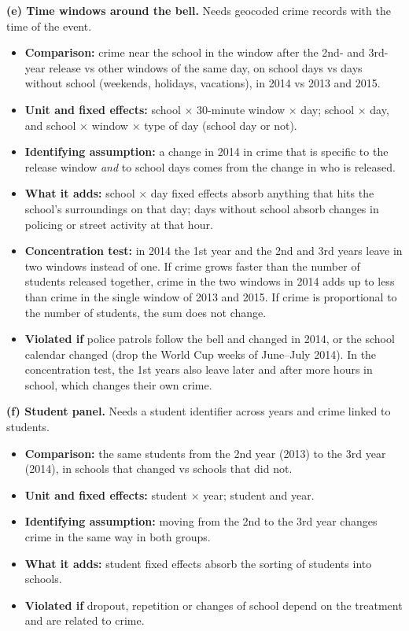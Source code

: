 \documentclass[11pt]{article}
\begin{document}
\medskip
\noindent\textbf{(e) Time windows around the bell.} Needs geocoded crime
records with the time of the event.
\begin{itemize}
  \item \textbf{Comparison:} crime near the school in the window after the 2nd-
        and 3rd-year release vs other windows of the same day, on school days
        vs days without school (weekends, holidays, vacations), in 2014 vs 2013
        and 2015.
  \item \textbf{Unit and fixed effects:} school $\times$ 30-minute window
        $\times$ day; school $\times$ day, and school $\times$ window $\times$
        type of day (school day or not).
  \item \textbf{Identifying assumption:} a change in 2014 in crime that is
        specific to the release window \emph{and} to school days comes from the
        change in who is released.
  \item \textbf{What it adds:} school $\times$ day fixed effects absorb anything
        that hits the school's surroundings on that day; days without school
        absorb changes in policing or street activity at that hour.
  \item \textbf{Concentration test:} in 2014 the 1st year and the 2nd and 3rd
        years leave in two windows instead of one. If crime grows faster than
        the number of students released together, crime in the two windows in
        2014 adds up to less than crime in the single window of 2013 and 2015.
        If crime is proportional to the number of students, the sum does not
        change.
  \item \textbf{Violated if} police patrols follow the bell and changed in
        2014, or the school calendar changed (drop the World Cup weeks of
        June--July 2014). In the concentration test, the 1st years also leave
        later and after more hours in school, which changes their own crime.
\end{itemize}

\medskip
\noindent\textbf{(f) Student panel.} Needs a student identifier across years
and crime linked to students.
\begin{itemize}
  \item \textbf{Comparison:} the same students from the 2nd year (2013) to the
        3rd year (2014), in schools that changed vs schools that did not.
  \item \textbf{Unit and fixed effects:} student $\times$ year; student and
        year.
  \item \textbf{Identifying assumption:} moving from the 2nd to the 3rd year
        changes crime in the same way in both groups.
  \item \textbf{What it adds:} student fixed effects absorb the sorting of
        students into schools.
  \item \textbf{Violated if} dropout, repetition or changes of school depend on
        the treatment and are related to crime.
\end{itemize}
\end{document}
